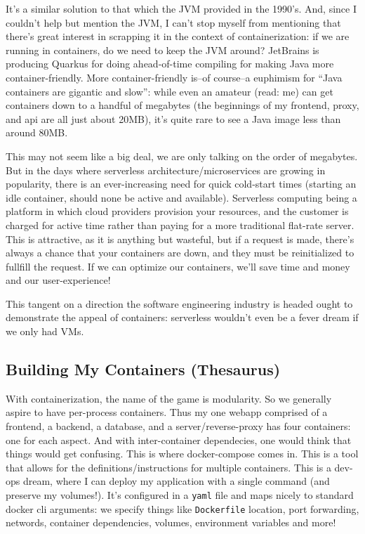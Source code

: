 \documentclass[11pt, twoside, reqno]{book}
\begin{document}
It's a similar solution to that which the JVM provided in the 1990's. And, since I couldn't help but mention the JVM, I can't stop myself from mentioning that there's great interest in scrapping it in the context of containerization: if we are running in containers, do we need to keep the JVM around? JetBrains is producing Quarkus for doing ahead-of-time compiling for making Java more container-friendly. More container-friendly is--of course--a euphimism for ``Java containers are gigantic and slow'': while even an amateur (read: me) can get containers down to a handful of megabytes (the beginnings of my frontend, proxy, and api are all just about 20MB), it's quite rare to see a Java image less than around 80MB.

This may not seem like a big deal, we are only talking on the order of megabytes. But in the days where serverless architecture/microservices are growing in popularity, there is an ever-increasing need for quick cold-start times (starting an idle container, should none be active and available). Serverless computing being a platform in which cloud providers provision your resources, and the customer is charged for active time rather than paying for a more traditional flat-rate server. This is attractive, as it is anything but wasteful, but if a request is made, there's always a chance that your containers are down, and they must be reinitialized to fullfill the request. If we can optimize our containers, we'll save time and money and our user-experience!

This tangent on a direction the software engineering industry is headed ought to demonstrate the appeal of containers: serverless wouldn't even be a fever dream if we only had VMs.

\subsection{Building My Containers (Thesaurus)}

With containerization, the name of the game is modularity. So we generally aspire to have per-process containers. Thus my one webapp comprised of a frontend, a backend, a database, and a server/reverse-proxy has four containers: one for each aspect. And with inter-container dependecies, one would think that things would get confusing. This is where docker-compose comes in. This is a tool that allows for the definitions/instructions for multiple containers. This is a dev-ops dream, where I can deploy my application with a single command (and preserve my volumes!). It's configured in a \texttt{yaml} file and maps nicely to standard docker cli arguments: we specify things like \texttt{Dockerfile} location, port forwarding, networds, container dependencies, volumes, environment variables and more!
\end{document}
